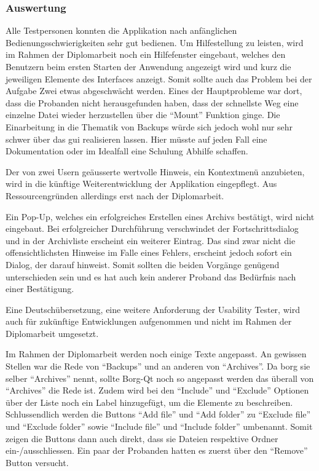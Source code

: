 \subsubsection{Auswertung}
\label{sec:org5ab75f4}

Alle Testpersonen konnten die Applikation nach anfänglichen
Bedienungsschwierigkeiten sehr gut bedienen. Um Hilfestellung zu leisten, wird
im Rahmen der Diplomarbeit noch ein Hilfefenster eingebaut, welches den
Benutzern beim ersten Starten der Anwendung angezeigt wird und kurz die
jeweiligen Elemente des Interfaces anzeigt. Somit sollte auch das Problem bei
der Aufgabe Zwei etwas abgeschwächt werden. Eines der Hauptprobleme war dort,
dass die Probanden nicht herausgefunden haben, dass der schnellste Weg eine
einzelne Datei wieder herzustellen über die "`Mount"' Funktion ginge. Die
Einarbeitung in die Thematik von Backups würde sich jedoch wohl nur sehr schwer
über das \gls{gui} realisieren lassen. Hier müsste auf jeden Fall eine
Dokumentation oder im Idealfall eine Schulung Abhilfe schaffen.

Der von zwei Usern geäusserte wertvolle Hinweis, ein Kontextmenü
anzubieten, wird in die künftige Weiterentwicklung der Applikation
eingepflegt. Aus Ressourcengründen allerdings erst nach der Diplomarbeit.

Ein Pop-Up, welches ein erfolgreiches Erstellen eines Archivs bestätigt, wird
nicht eingebaut. Bei erfolgreicher Durchführung verschwindet der
Fortschrittsdialog und in der Archivliste erscheint ein weiterer Eintrag. Das
sind zwar nicht die offensichtlichsten Hinweise im Falle eines Fehlers,
erscheint jedoch sofort ein Dialog, der darauf hinweist. Somit sollten die
beiden Vorgänge genügend unterschieden sein und es hat auch kein anderer
Proband das Bedürfnis nach einer Bestätigung.

Eine Deutschübersetzung, eine weitere Anforderung der Usability Tester, wird
auch für zukünftige Entwicklungen aufgenommen und nicht im Rahmen der
Diplomarbeit umgesetzt.

Im Rahmen der Diplomarbeit werden noch einige Texte angepasst. An gewissen
Stellen war die Rede von "`Backups"' und an anderen von "`Archives"'. Da \gls{borg}
sie selber "`Archives"' nennt, sollte Borg-Qt noch so angepasst werden das
überall von "`Archives"' die Rede ist. Zudem wird bei den "`Include"' und "`Exclude"'
Optionen über der Liste noch ein Label hinzugefügt, um die Elemente zu
beschreiben. Schlussendlich werden die Buttons "`Add file"' und "`Add folder"' zu
"`Exclude file"' und "`Exclude folder"' sowie "`Include file"' und "`Include folder"'
umbenannt. Somit zeigen die Buttons dann auch direkt, dass sie Dateien
respektive Ordner ein-/ausschliessen. Ein paar der Probanden hatten es zuerst
über den "`Remove"' Button versucht.

